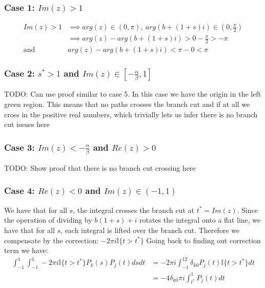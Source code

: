 \documentclass{article}
\begin{document}
\subsubsection{Case 1: $Im(z)>1$}
\begin{align}
    Im(z)>1 &\implies arg(z) \in (0,\pi), \: arg(b+(1+s)i) \in (0,\frac{\pi}{2})\\
    &\implies arg(z)-arg(b+(1+s)i) > 0-\frac{\pi}{2} > -\pi\\
    \text{and }& arg(z)-arg(b+(1+s)i)<\pi-0<\pi
\end{align}

\subsubsection{Case 2: $s^*>1$ and $Im(z)\in[-\frac{\alpha}{\beta},1]$}
TODO: Can use proof similar to case 5.
In this case we have the origin in the left green region.
This means that no paths crosses the branch cut and if at all we cross in the positive real numbers, which trivially lets us infer there is no branch cut issues here

\subsubsection{Case 3: $Im(z)<-\frac{\alpha}{\beta}$ and $Re(z)>0$}
TODO: Show proof that there is no branch cut crossing here

\subsubsection{Case 4: $Re(z)<0$ and $Im(z)\in(-1,1)$}
We have that for all $s$, the integral crosses the branch cut at $t^*=Im(z)$.
Since the operation of dividing by $b(1+s)+i$ rotates the integral onto a flat line, we have that for all $s$, each integral is lifted over the branch cut.
Therefore we compensate by the correction: $-2\pi i\mathbb{I}\{t>t^*\}$
Going back to finding out correction term we have:
\begin{align}
    \int_{-1}^1\int_{-1}^1-2\pi i\mathbb{I}\{t>t^*\}P_k(s)P_j(t)dsdt&=-2\pi i\int_{-1}^12\delta_{k0}P_j(t)\mathbb{I}\{t>t^*\}dt\\
    &=-4\delta_{k0}\pi i\int_{t^*}^1P_j(t)dt
\end{align}
\end{document}
